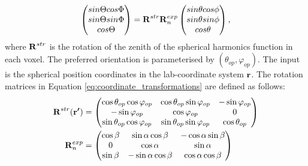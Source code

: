 \begin{equation}\label{eq:coordinate_transformations}
    \begin{pmatrix}
        sin \Theta cos \Phi \\
        sin \Theta sin \Phi \\
        cos \Theta
    \end{pmatrix}
    = \bm{\mathrm{R}}^{str} \bm{\mathrm{R}}_{n}^{exp}
    \begin{pmatrix}
        sin \theta cos \phi \\
        sin \theta sin \phi \\
        cos \theta
    \end{pmatrix},
\end{equation}
\noindent
where $\bm{\mathrm{R}}^{str}$ is the rotation of the zenith of the spherical harmonics function in each voxel. The preferred orientation is parameterised by $(\theta_{op}, \varphi_{op})$.
The input is the spherical position coordinates in the lab-coordinate system $\bm{\mathrm{r}}$.
The rotation matrices in Equation \eqref{eq:coordinate_transformations} are defined as follows:
\begin{equation}
    \begin{split}
        \bm{\mathrm{R}}^{str}(\bm{\mathrm{r'}}) &=
        \begin{pmatrix}
            \cos\theta_{op} \cos\varphi_{op} & \cos\theta_{op} \sin\varphi_{op} & -\sin\varphi_{op}  \\
            -\sin\varphi_{op}            & \cos\varphi_{op}             & 0           \\
            \sin\theta_{op} \cos\varphi_{op} & \sin\theta_{op} \sin\varphi_{op} & \cos\theta_{op}
        \end{pmatrix}\\
        \bm{\mathrm{R}}_{n}^{exp} &=
        \begin{pmatrix}
            \cos \beta & \sin \alpha \cos \beta & -\cos\alpha \sin\beta \\
            0          & \cos \alpha            & \sin \alpha           \\
            \sin\beta  & - \sin\alpha \cos\beta & \cos\alpha \cos\beta
        \end{pmatrix}
    \end{split}
\end{equation}

